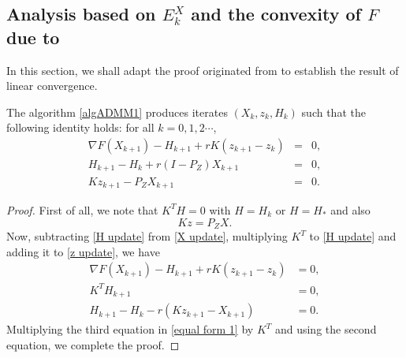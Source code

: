 \begin{itemize}
\subsection{Analysis based on $E_k^X$ and the convexity of $F$ due to \cite{shi2014linear}} 
In this section, we shall adapt the proof originated from \cite{shi2014linear} to establish the result of linear convergence.
\begin{lemma} 
The algorithm \ref{algADMM1} produces iterates $(X_k,z_k,H_k)$ such that the following identity holds: for all $k=0,1,2\cdots$, 
\begin{eqnarray*}\label{equal form 2}
\nabla F(X_{k+1}) - H_{k+1} + r K(z_{k+1} - z_{k}) &=& 0, \\
H_{k+1} - H_{k} + r \left( I - P_Z \right) X_{k+1} &=& 0,\\
K z_{k+1} - P_Z X_{k+1} &=& 0.
\end{eqnarray*}
\end{lemma} 
\begin{proof} 
First of all, we note that $K^TH = 0$ with $H = H_k$ or $H = H_*$ and also 
\begin{equation}
Kz = P_Z X. 
\end{equation}
Now, subtracting \eqref{H update} from \eqref{X update}, multiplying $K^T$ to \eqref{H update} and adding it to \eqref{z update}, we have
\begin{equation}\label{equal form 1}
    \begin{split}
        \nabla F(X_{k+1}) - H_{k+1} + r K(z_{k+1} - z_{k}) &= 0, \\
        K^T H_{k+1} &= 0, \\
        H_{k+1} - H_{k}  - r (K z_{k+1} - X_{k+1}) &= 0. 
    \end{split}
\end{equation}
Multiplying the third equation in \eqref{equal form 1} by $K^T$ and using the second equation, we complete the proof. 
\end{proof}






\end{itemize}

